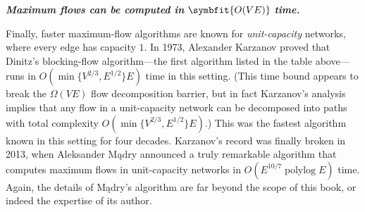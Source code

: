 \begin{problembox}
\textbf{\textit{Maximum flows can be computed in}} $\symbfit{O(VE)}$ \textbf{\textit{time.}}
\end{problembox}

Finally, faster maximum-flow algorithms are known for \textit{unit-capacity} networks, where every edge has capacity $1$.
In 1973, Alexander Karzanov proved that Dinitz’s blocking-flow algorithm---the first algorithm listed in the table above---runs in $O(\min\{V^{2/3}, E^{1/2}\} E)$ time in this setting.
(This time bound appears to break the $\Omega(VE)$ flow decomposition barrier, but in fact Karzanov’s analysis implies that any flow in a unit-capacity network can be decomposed into paths with total complexity $O(\min\{V^{2/3}, E^{1/2}\} E)$.)
This was the fastest algorithm known in this setting for four decades.
Karzanov’s record was finally broken in 2013, when Aleksander Mądry announced a truly remarkable algorithm that computes maximum flows in unit-capacity networks in $O(E^{10/7} \operatorname{polylog} E)$ time.
Again, the details of Mądry’s algorithm are far beyond the scope of this book, or indeed the expertise of its author.


